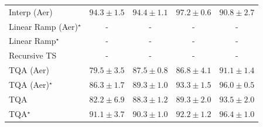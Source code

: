 \begin{tabular}{l|cccc|}
Interp (Aer) & {\cellcolor[HTML]{B34003}} \color[HTML]{F1F1F1} $94.3\pm 1.5$ & {\cellcolor[HTML]{B13F03}} \color[HTML]{F1F1F1} $94.4\pm 1.1$ & {\cellcolor[HTML]{7C2C05}} \color[HTML]{F1F1F1} $97.2\pm 0.6$ & {\cellcolor[HTML]{E66A11}} \color[HTML]{F1F1F1} $90.8\pm 2.7$ \\
Linear Ramp (Aer)$^\star$ & {\cellcolor[HTML]{000000}} \color[HTML]{F1F1F1} {\cellcolor{white}} \color{black} - & {\cellcolor[HTML]{000000}} \color[HTML]{F1F1F1} {\cellcolor{white}} \color{black} - & {\cellcolor[HTML]{000000}} \color[HTML]{F1F1F1} {\cellcolor{white}} \color{black} - & {\cellcolor[HTML]{000000}} \color[HTML]{F1F1F1} {\cellcolor{white}} \color{black} - \\
Linear Ramp$^\star$ & {\cellcolor[HTML]{000000}} \color[HTML]{F1F1F1} {\cellcolor{white}} \color{black} - & {\cellcolor[HTML]{000000}} \color[HTML]{F1F1F1} {\cellcolor{white}} \color{black} - & {\cellcolor[HTML]{000000}} \color[HTML]{F1F1F1} {\cellcolor{white}} \color{black} - & {\cellcolor[HTML]{000000}} \color[HTML]{F1F1F1} {\cellcolor{white}} \color{black} - \\
Recursive TS & {\cellcolor[HTML]{000000}} \color[HTML]{F1F1F1} {\cellcolor{white}} \color{black} - & {\cellcolor[HTML]{000000}} \color[HTML]{F1F1F1} {\cellcolor{white}} \color{black} - & {\cellcolor[HTML]{000000}} \color[HTML]{F1F1F1} {\cellcolor{white}} \color{black} - & {\cellcolor[HTML]{000000}} \color[HTML]{F1F1F1} {\cellcolor{white}} \color{black} - \\
TQA (Aer) & {\cellcolor[HTML]{FFF7BC}} \color[HTML]{000000} $79.5\pm 3.5$ & {\cellcolor[HTML]{FE9B2B}} \color[HTML]{000000} $87.5\pm 0.8$ & {\cellcolor[HTML]{FEA634}} \color[HTML]{000000} $86.8\pm 4.1$ & {\cellcolor[HTML]{E2650F}} \color[HTML]{F1F1F1} $91.1\pm 1.4$ \\
TQA (Aer)$^\star$ & {\cellcolor[HTML]{FEAE3B}} \color[HTML]{000000} $86.3\pm 1.7$ & {\cellcolor[HTML]{F27F1B}} \color[HTML]{F1F1F1} $89.3\pm 1.0$ & {\cellcolor[HTML]{C64902}} \color[HTML]{F1F1F1} $93.3\pm 1.5$ & {\cellcolor[HTML]{933204}} \color[HTML]{F1F1F1} $96.0\pm 0.5$ \\
TQA & {\cellcolor[HTML]{FEE390}} \color[HTML]{000000} $82.2\pm 6.9$ & {\cellcolor[HTML]{F98E23}} \color[HTML]{F1F1F1} $88.3\pm 1.2$ & {\cellcolor[HTML]{F27F1B}} \color[HTML]{F1F1F1} $89.3\pm 2.0$ & {\cellcolor[HTML]{C34802}} \color[HTML]{F1F1F1} $93.5\pm 2.0$ \\
TQA$^\star$ & {\cellcolor[HTML]{E2650F}} \color[HTML]{F1F1F1} $91.1\pm 3.7$ & {\cellcolor[HTML]{EC7014}} \color[HTML]{F1F1F1} $90.3\pm 1.0$ & {\cellcolor[HTML]{D55607}} \color[HTML]{F1F1F1} $92.2\pm 1.2$ & {\cellcolor[HTML]{8B3005}} \color[HTML]{F1F1F1} $96.4\pm 1.0$ \\

\end{tabular}
